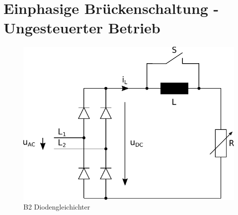\section{Einphasige Brückenschaltung - Ungesteuerter Betrieb}

\begin{figure}[h!]
    \centering
    \includegraphics[scale=\sscale]{./../fig/b2_diode.pdf}
    \caption{B2 Diodengleichichter}
    \label{fig:b2_diode}
\end{figure}
